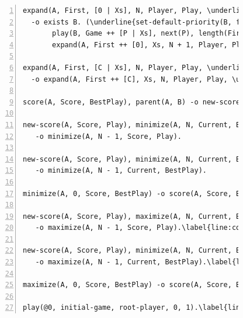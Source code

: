 \begin{figure}[ht]
\begin{Verbatim}[numbers=left,commandchars=\\\{\},fontsize=\scriptsize]
expand(A, First, [0 | Xs], N, Player, Play, \underline{Depth}), Depth < 5\label{line:coord:minimax_rule41}\hfill// Rule 6: create child node
  -o exists B. (\underline{set-default-priority(B, float(Depth + 1))},\label{line:coord:minimax_coord3}
       play(B, Game ++ [P | Xs], next(P), length(First), \underline{Depth + 1}), parent(B, A),
       expand(A, First ++ [0], Xs, N + 1, Player, Play, \underline{Depth})).\label{line:coord:minimax_rule42}

expand(A, First, [C | Xs], N, Player, Play, \underline{Depth}), C <> 0\label{line:coord:minimax_expand11}\label{line:coord:minimax_rule51}\hfill// Rule 7: next game play
  -o expand(A, First ++ [C], Xs, N, Player, Play, \underline{Depth}).\label{line:coord:minimax_expand2}\label{line:coord:minimax_rule52}

score(A, Score, BestPlay), parent(A, B) -o new-score(B, Score, BestPlay).\label{line:coord:minimax_new}\hfill// Rule 8: sending score to parent node

new-score(A, Score, Play), minimize(A, N, Current, BestPlay), Current > Score\label{line:coord:minimax_minimize1}\hfill// Rule 9: keep current score
   -o minimize(A, N - 1, Score, Play).

new-score(A, Score, Play), minimize(A, N, Current, BestPlay), Current <= Score\hfill// Rule 10: select new best
   -o minimize(A, N - 1, Current, BestPlay).

minimize(A, 0, Score, BestPlay) -o score(A, Score, BestPlay).\label{line:coord:minimax_minimize2}// Rule 11: score minimized

new-score(A, Score, Play), maximize(A, N, Current, BestPlay), Current < Score\label{line:coord:minimax_maximize1}\label{line:coord:minimax_maximize_rule11}\hfill// Rule 12: keep current score
   -o maximize(A, N - 1, Score, Play).\label{line:coord:minimax_maximize_rule12}

new-score(A, Score, Play), minimize(A, N, Current, BestPlay), Current >= Score\label{line:coord:minimax_maximize_rule21}\hfill// Rule 13: select new best
   -o maximize(A, N - 1, Current, BestPlay).\label{line:coord:minimax_maximize_rule22}

maximize(A, 0, Score, BestPlay) -o score(A, Score, BestPlay).\label{line:coord:minimax_maximize2}\hfill// Rule 14: score maximized

play(@0, initial-game, root-player, 0, 1).\label{line:coord:minimax_axiom}\hfill// Initial fact
\end{Verbatim}
\label{code:coord:minimax}
\end{figure}

